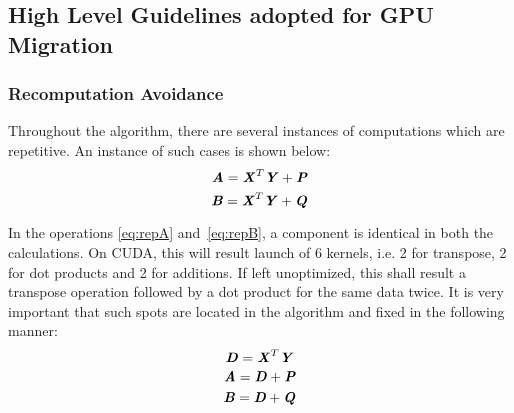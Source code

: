 \documentclass[thesis.tex]{subfiles}
\begin{document}
\subsection{High Level Guidelines adopted for GPU Migration}
\subsubsection{Recomputation Avoidance}
Throughout the algorithm, there are several instances of computations which are repetitive. An instance of such cases is shown below:\\
\begin{equation}\label{eq:repA}
\textbf{\textit{A}} = \textbf{\textit{X}}^{T}\textbf{\textit{Y}} + \textbf{\textit{P}}
\end{equation}
\begin{equation}\label{eq:repB}
\textbf{\textit{B}} = \textbf{\textit{X}}^{T}\textbf{\textit{Y}} + \textbf{\textit{Q}}
\end{equation}

In the operations \ref{eq:repA} and~\ref{eq:repB}, a component is identical in both the calculations. On CUDA, this will result launch of 6 kernels, i.e. 2 for transpose, 2 for dot products and 2 for additions. If left unoptimized, this shall result a transpose operation followed by a dot product for the same data twice. It is very important that such spots are located in the algorithm and fixed in the following manner:\\
\begin{equation*}
	\textbf{\textit{D}} = \textbf{\textit{X}}^{T}\textbf{\textit{Y}}
\end{equation*}
\begin{equation*}
	\textbf{\textit{A}} = \textbf{\textit{D}} + \textbf{\textit{P}}
\end{equation*}
\begin{equation*}
	\textbf{\textit{B}} = \textbf{\textit{D}} + \textbf{\textit{Q}}
\end{equation*}
\end{document}
